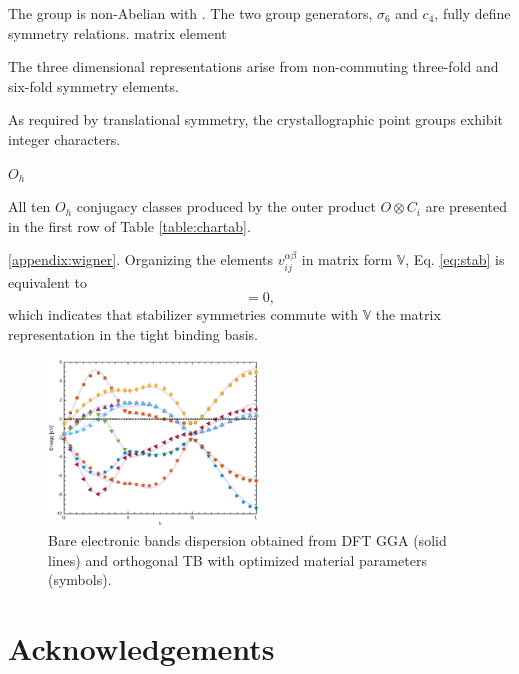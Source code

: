 \documentclass[twocolumn,showpacs,preprintnumbers,superscriptaddress,prb,floatfix,aps,10pt]{revtex4-1}
\newcommand*{\wignerD}{\mathbb{D}(R)}
\begin{document}
The group is non-Abelian with . The two group generators, $\sigma_6$ and $c_4$, fully define symmetry relations.
matrix element 


The three dimensional representations arise from non-commuting three-fold and six-fold symmetry elements. 




As required by translational symmetry, the crystallographic point groups exhibit integer characters.







$O_h$



All ten $O_h$ conjugacy classes produced by the outer product $O \otimes C_i$ are presented in the first row of Table \ref{table:chartab}.




\ref{appendix:wigner}.
%
Organizing the elements $v_{ij}^{\alpha\beta}$ in matrix form $\mathbb{V}$, Eq. \ref{eq:stab} is equivalent to
\begin{equation}
[\mathbb{V},\wignerD] = 0, 
\end{equation}
which indicates that stabilizer symmetries commute with $\mathbb{V}$ the matrix representation in the tight binding basis.






\begin{figure}
\label{fig:kappa_vs_t}
\includegraphics[width=0.5\textwidth]{band_structure.eps}
\caption{Bare electronic bands dispersion obtained from DFT GGA (solid lines) and orthogonal TB with optimized material parameters (symbols). } 
\end{figure}



\section{Acknowledgements}
\end{document}
